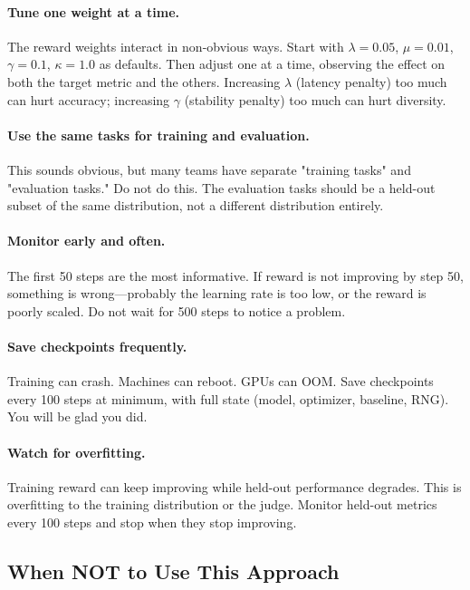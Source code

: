 \documentclass[11pt]{article}
\begin{document}
\paragraph{Tune one weight at a time.}
The reward weights interact in non-obvious ways.
Start with $\lambda = 0.05$, $\mu = 0.01$, $\gamma = 0.1$, $\kappa = 1.0$ as defaults.
Then adjust one at a time, observing the effect on both the target metric and the others.
Increasing $\lambda$ (latency penalty) too much can hurt accuracy; increasing $\gamma$ (stability penalty) too much can hurt diversity.

\paragraph{Use the same tasks for training and evaluation.}
This sounds obvious, but many teams have separate "training tasks" and "evaluation tasks."
Do not do this.
The evaluation tasks should be a held-out subset of the same distribution, not a different distribution entirely.

\paragraph{Monitor early and often.}
The first 50 steps are the most informative.
If reward is not improving by step 50, something is wrong---probably the learning rate is too low, or the reward is poorly scaled.
Do not wait for 500 steps to notice a problem.

\paragraph{Save checkpoints frequently.}
Training can crash.
Machines can reboot.
GPUs can OOM.
Save checkpoints every 100 steps at minimum, with full state (model, optimizer, baseline, RNG).
You will be glad you did.

\paragraph{Watch for overfitting.}
Training reward can keep improving while held-out performance degrades.
This is overfitting to the training distribution or the judge.
Monitor held-out metrics every 100 steps and stop when they stop improving.

\subsection{When NOT to Use This Approach}
\end{document}
